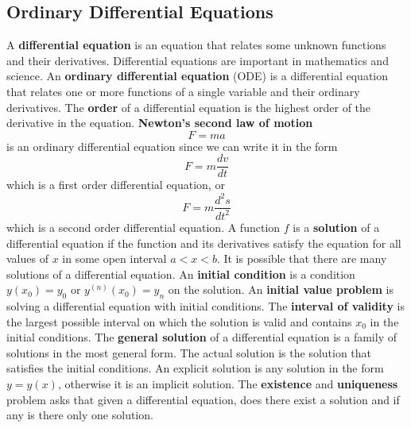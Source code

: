 \subsection{Ordinary Differential Equations}
A \textbf{differential equation} is an equation that relates some unknown
functions and their derivatives.
Differential equations are important in mathematics and science.
An \textbf{ordinary differential equation} (ODE) is a differential equation
that relates one or more functions of a single variable and their ordinary
derivatives.
The \textbf{order} of a differential equation is the highest order of the
derivative in the equation.
\textbf{Newton's second law of motion} \[F=ma\] is an ordinary differential
equation since we can write it in the form \[F=m\frac{dv}{dt}\] which is a first order
differential equation, or \[F=m\frac{d^2s}{dt^2}\] which is a second order
differential equation.
A function \(f\) is a \textbf{solution} of a differential equation if the
function and its derivatives satisfy the equation for all values of \(x\) in
some open interval \(a<x<b\).
It is possible that there are many solutions of a differential equation.
An \textbf{initial condition} is a condition \(y(x_0)=y_0\) or
\(y^{(n)}(x_0)=y_n\) on the solution.
An \textbf{initial value problem} is solving a differential equation with initial conditions.
The \textbf{interval of validity} is the largest possible interval on which
the solution is valid and contains \(x_0\) in the initial conditions.
The \textbf{general solution} of a differential equation is a family of
solutions in the most general form.
The actual solution is the solution that satisfies the initial conditions.
An explicit solution is any solution in the form \(y=y(x)\), otherwise it is
an implicit solution.
The \textbf{existence} and \textbf{uniqueness} problem asks that given a
differential equation, does there exist a solution and if any is there only
one solution.